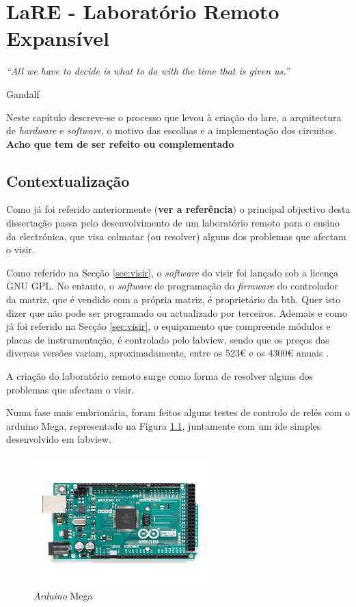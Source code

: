\chapter{LaRE - Laboratório Remoto Expansível}
\label{Capítulo3}
\begin{center}
	\textit{``All we have to decide is what to do with the time that is given us.''}

	Gandalf
\end{center}

Neste capítulo descreve-se o processo que levou à criação do \acrshort{lare}, a arquitectura de \textit{hardware} e \textit{software}, o motivo das escolhas e a implementação dos circuitos. \textbf{Acho que tem de ser refeito ou complementado}

\section{Contextualização}
\label{sec:contextualização}
Como já foi referido anteriormente (\textbf{ver a referência}) o principal objectivo desta dissertação passa pelo desenvolvimento de um \acrshort{laboratório remoto} para o ensino da electrónica, que visa colmatar (ou resolver) alguns dos problemas que afectam o \acrshort{visir}.

Como referido na Secção \ref{sec:visir}, o \textit{software} do \acrshort{visir} foi lançado sob a licença GNU GPL. No entanto, o \textit{software} de programação do \textit{firmware} do controlador da matriz, que é vendido com a própria matriz, é proprietário da \acrshort{bth}. Quer isto dizer que não pode ser programado ou actualizado por terceiros. Ademais e como já foi referido na Secção \ref{sec:visir}, o equipamento que compreende módulos e placas de instrumentação, é controlado pelo \acrshort{labview}, sendo que os preços das diversas versões variam, aproximadamente, entre os 523€ e os 4300€ anuais \cite{labviewpricing}.

A criação do \acrshort{laboratório remoto} surge como forma de resolver alguns dos problemas que afectam o \acrshort{visir}.

Numa fase mais embrionária, foram feitos alguns testes de controlo de relés com o \gls{arduino} Mega, representado na Figura \ref{fig:arduinomega}, juntamente com um \acrfull{ide} simples desenvolvido em \acrshort{labview}.

\begin{figure}[hbtp]
	\centering
	\includegraphics[width=0.6\textwidth]{figures/arduinomega.png}
	\caption{\textit{Arduino} Mega \cite{ArduinoMega}}
	\label{fig:arduinomega}
\end{figure}

